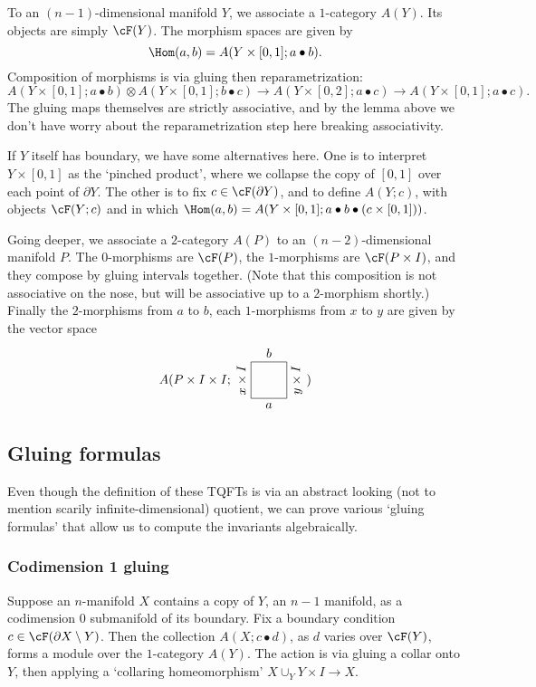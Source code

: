 \documentclass[11pt]{amsart}
\theoremstyle{plain}
\newcommand{\bdy}{\partial}
\newcommand{\tensor}{\otimes}
\begin{document}
To an $(n-1)$-dimensional manifold $Y$, we associate a $1$-category $A(Y)$. Its objects are simply $\cF(Y)$. The morphism spaces are given by $$\Hom(a,b) = A(Y \times [0,1]; a \bullet b).$$
Composition of morphisms is via gluing then reparametrization:
$$A(Y \times [0,1]; a \bullet b) \tensor A(Y \times [0,1]; b \bullet c) \to A(Y \times [0,2]; a \bullet c) \to A(Y \times [0,1]; a \bullet c).$$
The gluing maps themselves are strictly associative, and by the lemma above we don't have worry about the reparametrization step here breaking associativity.


If $Y$ itself has boundary, we have some alternatives here. One is to interpret $Y \times [0,1]$ as the `pinched product', where we collapse the copy of $[0,1]$ over each point of $\bdy Y$. The other is to fix $c \in \cF(\bdy Y)$, and to define $A(Y; c)$, with objects $\cF(Y; c)$ and in which $\Hom(a,b) = A(Y \times [0,1]; a \bullet b \bullet (c \times [0,1]))$.

Going deeper, we associate a $2$-category $A(P)$ to an $(n-2)$-dimensional manifold $P$. The $0$-morphisms are $\cF(P)$, the $1$-morphisms are $\cF(P \times I)$, and they compose by gluing intervals together. (Note that this composition is not associative on the nose, but will be associative up to a $2$-morphism shortly.) Finally the $2$-morphisms from $a$ to $b$, each $1$-morphisms from $x$ to $y$ are given by the vector space
$$A(P \times I \times I; \tikz[baseline=11.5]{\draw (0,0) -- node[below] {$a$} (1,0) -- node[below, sloped] {$y \times I$} (1,1) -- node[above] {$b$} (0,1) (0,0) -- node[above,sloped] {$x \times I$} (0,1);})$$ 

\subsection{Gluing formulas}
Even though the definition of these TQFTs is via an abstract looking (not to mention scarily infinite-dimensional) quotient, we can prove various `gluing formulas' that allow us to compute the invariants algebraically.

\subsubsection{Codimension 1 gluing}

Suppose an $n$-manifold $X$ contains a copy of $Y$, an $n-1$ manifold, as a codimension $0$ submanifold of its boundary. Fix a boundary condition $c \in \cF(\bdy X \setminus Y)$. Then the collection $A(X; c \bullet d)$, as $d$ varies over $\cF(Y)$, forms a module over the $1$-category $A(Y)$. The action is via gluing a collar onto $Y$, then applying a `collaring homeomorphism' $X \cup_Y Y \times I \to X$.
\end{document}
